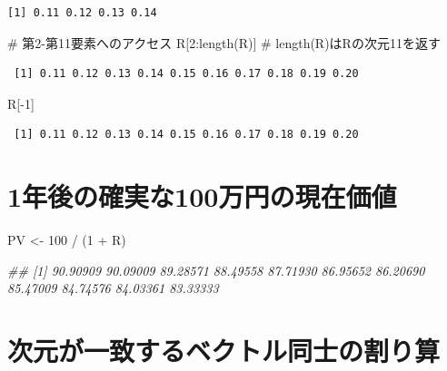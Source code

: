 \documentclass[
  letterpaper,
  DIV=11,
  numbers=noendperiod]{scrreprt}
\newenvironment{Shaded}{\begin{snugshade}}{\end{snugshade}}
\newcommand{\CommentTok}[1]{\textcolor[rgb]{0.37,0.37,0.37}{#1}}
\newcommand{\DecValTok}[1]{\textcolor[rgb]{0.68,0.00,0.00}{#1}}
\newcommand{\DocumentationTok}[1]{\textcolor[rgb]{0.37,0.37,0.37}{\textit{#1}}}
\newcommand{\FunctionTok}[1]{\textcolor[rgb]{0.28,0.35,0.67}{#1}}
\newcommand{\NormalTok}[1]{\textcolor[rgb]{0.00,0.23,0.31}{#1}}
\newcommand{\OtherTok}[1]{\textcolor[rgb]{0.00,0.23,0.31}{#1}}
\newcommand{\SpecialCharTok}[1]{\textcolor[rgb]{0.37,0.37,0.37}{#1}}
\begin{document}
\begin{verbatim}
[1] 0.11 0.12 0.13 0.14
\end{verbatim}

\begin{Shaded}
\begin{Highlighting}[]
\CommentTok{\# 第2{-}第11要素へのアクセス}
\NormalTok{R[}\DecValTok{2}\SpecialCharTok{:}\FunctionTok{length}\NormalTok{(R)] }\CommentTok{\# length(R)はRの次元11を返す}
\end{Highlighting}
\end{Shaded}

\begin{verbatim}
 [1] 0.11 0.12 0.13 0.14 0.15 0.16 0.17 0.18 0.19 0.20
\end{verbatim}

\begin{Shaded}
\begin{Highlighting}[]
\NormalTok{R[}\SpecialCharTok{{-}}\DecValTok{1}\NormalTok{]}
\end{Highlighting}
\end{Shaded}

\begin{verbatim}
 [1] 0.11 0.12 0.13 0.14 0.15 0.16 0.17 0.18 0.19 0.20
\end{verbatim}

\section{1年後の確実な100万円の現在価値}\label{ux5e74ux5f8cux306eux78baux5b9fux306a100ux4e07ux5186ux306eux73feux5728ux4fa1ux5024}

\begin{Shaded}
\begin{Highlighting}[]
\NormalTok{PV }\OtherTok{\textless{}{-}} \DecValTok{100} \SpecialCharTok{/}\NormalTok{ (}\DecValTok{1} \SpecialCharTok{+}\NormalTok{ R)}

\DocumentationTok{\#\#  [1] 90.90909 90.09009 89.28571 88.49558 87.71930 86.95652 86.20690 85.47009 84.74576 84.03361 83.33333}
\end{Highlighting}
\end{Shaded}

\section{次元が一致するベクトル同士の割り算}\label{ux6b21ux5143ux304cux4e00ux81f4ux3059ux308bux30d9ux30afux30c8ux30ebux540cux58ebux306eux5272ux308aux7b97}
\end{document}
